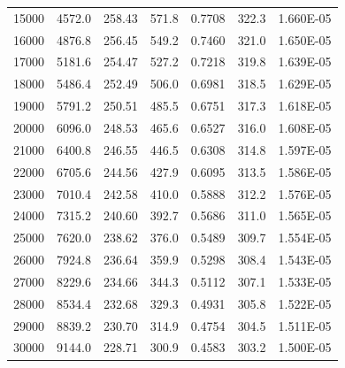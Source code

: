 \begin{table}[ht!]
\begin{tabular}{rrrrrrr}
        	15000	&	4572.0	&	258.43	&	571.8	&	0.7708	&	322.3	&	1.660E-05	\\
        	16000	&	4876.8	&	256.45	&	549.2	&	0.7460	&	321.0	&	1.650E-05	\\
        	17000	&	5181.6	&	254.47	&	527.2	&	0.7218	&	319.8	&	1.639E-05	\\
        	18000	&	5486.4	&	252.49	&	506.0	&	0.6981	&	318.5	&	1.629E-05	\\
        	19000	&	5791.2	&	250.51	&	485.5	&	0.6751	&	317.3	&	1.618E-05	\\
        	20000	&	6096.0	&	248.53	&	465.6	&	0.6527	&	316.0	&	1.608E-05	\\
        	21000	&	6400.8	&	246.55	&	446.5	&	0.6308	&	314.8	&	1.597E-05	\\
        	22000	&	6705.6	&	244.56	&	427.9	&	0.6095	&	313.5	&	1.586E-05	\\
        	23000	&	7010.4	&	242.58	&	410.0	&	0.5888	&	312.2	&	1.576E-05	\\
        	24000	&	7315.2	&	240.60	&	392.7	&	0.5686	&	311.0	&	1.565E-05	\\
        	25000	&	7620.0	&	238.62	&	376.0	&	0.5489	&	309.7	&	1.554E-05	\\
        	26000	&	7924.8	&	236.64	&	359.9	&	0.5298	&	308.4	&	1.543E-05	\\
        	27000	&	8229.6	&	234.66	&	344.3	&	0.5112	&	307.1	&	1.533E-05	\\
        	28000	&	8534.4	&	232.68	&	329.3	&	0.4931	&	305.8	&	1.522E-05	\\
        	29000	&	8839.2	&	230.70	&	314.9	&	0.4754	&	304.5	&	1.511E-05	\\
        	30000	&	9144.0	&	228.71	&	300.9	&	0.4583	&	303.2	&	1.500E-05	\\

\end{tabular}
\end{table}
